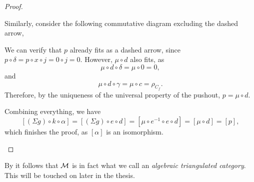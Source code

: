\begin{proof}
\begin{enumerate}[label={(\bfseries TR\arabic*)}]
{            %
            Similarly, consider the following commutative diagram excluding the dashed arrow,
            \begin{center}
            \end{center}

            We can verify that \( p \) already fits as a dashed arrow, since \( p \circ \delta = p \circ x \circ j = 0 \circ j = 0 \). However, \( \mu \circ d \) also fits, as
            \[
                \mu \circ d \circ \delta = \mu \circ 0 = 0,
            \]
            and
            \[
               \mu \circ d \circ \gamma = \mu \circ c = \rho_{C_f}.
            \]
            Therefore, by the uniqueness of the universal property of the pushout, \( p = \mu \circ d \).

            Combining everything, we have
            \[
                [(\Sigma g) \circ k \circ \alpha] = [(\Sigma g) \circ e \circ d] =[\mu \circ e^{-1} \circ e \circ d] = [\mu \circ d] = [p],
            \]
            which finishes the proof, as \( [\alpha] \) is an isomorphism. \qedhere
        }
    \end{enumerate}
\end{proof}

By \cite[Lemma, Subsection 7.5]{Krause_2007} it follows that \( {\mathcal{M}} \) is in fact what we call an \emph{algebraic triangulated category}. This will be touched on later in the thesis. %